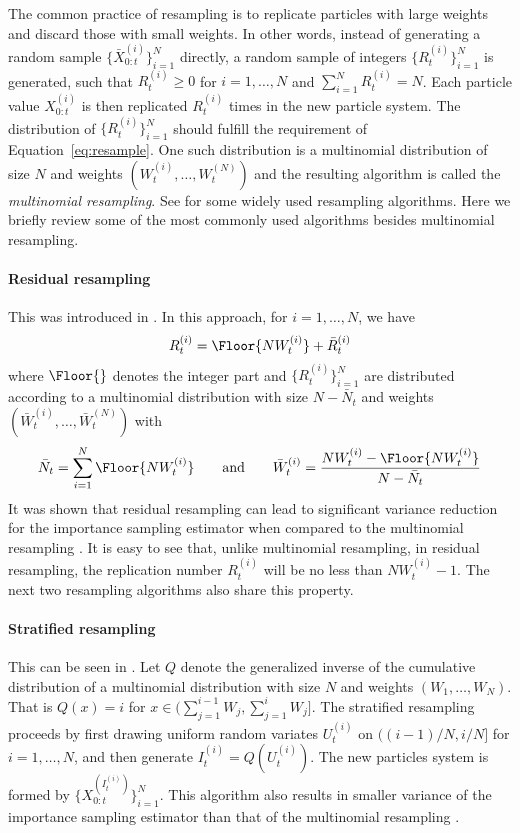The common practice of resampling is to replicate particles with large weights and discard those with small weights. In other words, instead of generating a random sample $\{\bar{X}_{0:t}^{(i)}\}_{i=1}^N$ directly, a random sample of integers $\{R_t^{(i)}\}_{i=1}^N$ is generated, such that $R_t^{(i)} \ge 0$ for $i = 1,\dots,N$ and $\sum_{i=1}^N R_t^{(i)} = N$. Each particle value $X_{0:t}^{(i)}$ is then replicated $R_t^{(i)}$ times in the new particle system. The distribution of $\{R_t^{(i)}\}_{i=1}^N$ should fulfill the requirement of Equation~\eqref{eq:resample}. One such distribution is a multinomial distribution of size $N$ and weights $(W_t^{(i)},\dots,W_t^{(N)})$ and the resulting algorithm is called the \emph{multinomial resampling}. See \cite{Douc:2005wa} for some widely used resampling algorithms. Here we briefly review some of the most commonly used algorithms besides multinomial resampling.

\paragraph{Residual resampling}

This was introduced in \cite{Liu:1998iu}. In this approach, for $i = 1,\dots,N$, we have
\begin{equation}
  R_t^{(i)} = \Floor{NW_t^{(i)}} + \bar{R}_t^{(i)}
\end{equation}
where $\Floor{}$ denotes the integer part and $\{R_t^{(i)}\}_{i=1}^N$ are distributed according to a multinomial distribution with size $N - \bar{N}_t$ and weights $(\bar{W}_t^{(i)},\dots,\bar{W}_t^{(N)})$ with
\begin{equation*}
  \bar{N}_t = \sum_{i=1}^N\Floor{NW_t^{(i)}} \qquad\text{and}\qquad
  \bar{W}_t^{(i)} = \frac{NW_t^{(i)} - \Floor{NW_t^{(i)}}}{N - \bar{N}_t}
\end{equation*}
It was shown that residual resampling can lead to significant variance reduction for the importance sampling estimator when compared to the multinomial resampling \cite{Douc:2005wa}. It is easy to see that, unlike multinomial resampling, in residual resampling, the replication number $R_t^{(i)}$ will be no less than $NW_t^{(i)} - 1$. The next two resampling algorithms also share this property.

\paragraph{Stratified resampling}

This can be seen in \cite{Kitagawa:1996vx}. Let $Q$ denote the generalized inverse of the cumulative distribution of a multinomial distribution with size $N$ and weights $(W_1,\dots,W_N)$. That is $Q(x) = i$ for $x\in(\sum_{j=1}^{i-1}W_j,\sum_{j=1}^iW_j]$. The stratified resampling proceeds by first drawing uniform random variates $U_t^{(i)}$ on $((i-1)/N, i/N]$ for $i = 1,\dots,N$, and then generate $I_t^{(i)} = Q(U_t^{(i)})$. The new particles system is formed by $\{X_{0:t}^{(I_t^{(i)})}\}_{i=1}^N$. This algorithm also results in smaller variance of the importance sampling estimator than that of the multinomial resampling \cite{Douc:2005wa}.

